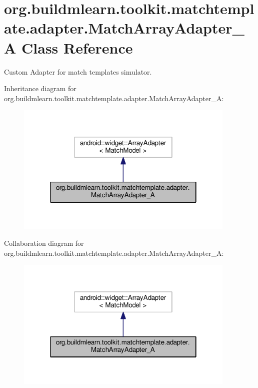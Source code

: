 \hypertarget{classorg_1_1buildmlearn_1_1toolkit_1_1matchtemplate_1_1adapter_1_1MatchArrayAdapter__A}{}\section{org.\+buildmlearn.\+toolkit.\+matchtemplate.\+adapter.\+Match\+Array\+Adapter\+\_\+A Class Reference}
\label{classorg_1_1buildmlearn_1_1toolkit_1_1matchtemplate_1_1adapter_1_1MatchArrayAdapter__A}


Custom Adapter for match template\textquotesingle{}s simulator.  




Inheritance diagram for org.\+buildmlearn.\+toolkit.\+matchtemplate.\+adapter.\+Match\+Array\+Adapter\+\_\+A\+:
\nopagebreak
\begin{figure}[H]
\begin{center}
\leavevmode
\includegraphics[width=298pt]{classorg_1_1buildmlearn_1_1toolkit_1_1matchtemplate_1_1adapter_1_1MatchArrayAdapter__A__inherit__graph}
\end{center}
\end{figure}


Collaboration diagram for org.\+buildmlearn.\+toolkit.\+matchtemplate.\+adapter.\+Match\+Array\+Adapter\+\_\+A\+:
\nopagebreak
\begin{figure}[H]
\begin{center}
\leavevmode
\includegraphics[width=298pt]{classorg_1_1buildmlearn_1_1toolkit_1_1matchtemplate_1_1adapter_1_1MatchArrayAdapter__A__coll__graph}
\end{center}
\end{figure}
